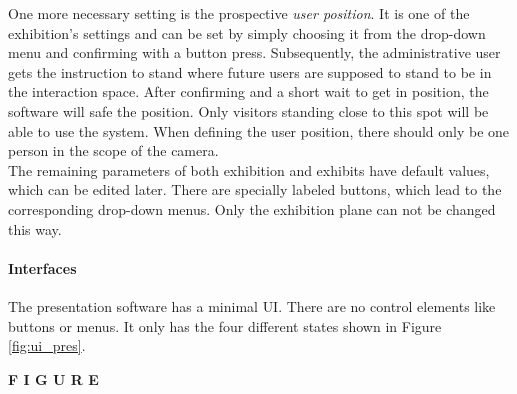 One more necessary setting is the prospective \textit{user position}. It is one of the exhibition's settings and can be set by simply choosing it from the drop-down menu and confirming with a button press. Subsequently, the administrative user gets the instruction to stand where future users are supposed to stand to be in the interaction space. After confirming and a short wait to get in position, the software will safe the position. Only visitors standing close to this spot will be able to use the system. When defining the user position, there should only be one person in the scope of the camera.
\\
The remaining parameters of both exhibition and exhibits have default values, which can be edited later. There are specially labeled buttons, which lead to the corresponding drop-down menus. Only the exhibition plane can not be changed this way.


\paragraph{Interfaces} The presentation software has a minimal \ac{UI}. There are no control elements like buttons or menus. It only has the four different states shown in Figure \ref{fig:ui_pres}.

\textbf{F I G U R E}

